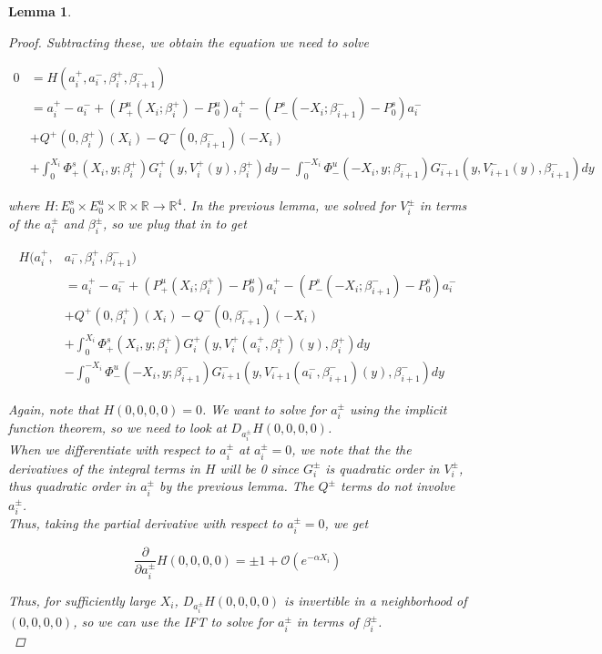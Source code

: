 \documentclass[12pt]{article}
\def\R{{\mathbb R}}
\newtheorem{lemma}{Lemma}
\begin{document}
\begin{lemma}
\begin{proof}
Subtracting these, we obtain the equation we need to solve

\begin{align*}
0 &= H(a_i^+, a_i^-, \beta_i^+, \beta_{i+1}^-) \\
&= a_i^+ - a_i^- + (P^u_+(X_i; \beta_i^+) -  P^u_0)a_i^+ - (P^s_-(-X_i; \beta_{i+1}^-) - P^s_0) a_i^-  \\
&+ Q^+(0, \beta_i^+)(X_i) - Q^-(0, \beta_{i+1}^-)(-X_i)\\
&+ \int_0^{X_i} \Phi_+^s(X_i, y; \beta_i^+) G_i^+(y, V_i^+(y),\beta_i^+)dy
- \int_0^{-X_i} \Phi_-^u(-X_i, y; \beta_{i+1}^-) G_{i+1}^-(y, V_{i+1}^-(y),\beta_{i+1}^-)dy 
\end{align*}

where $H: E_0^s \times E_0^u \times \R \times \R \rightarrow \R^4$. In the previous lemma, we solved for $V_i^\pm$ in terms of the $a_i^\pm$ and $\beta_i^\pm$, so we plug that in to get

\begin{align*}
H(a_i^+, &a_i^-, \beta_i^+, \beta_{i+1}^-) \\
&= a_i^+ - a_i^- + (P^u_+(X_i; \beta_i^+) -  P^u_0)a_i^+ - (P^s_-(-X_i; \beta_{i+1}^-) - P^s_0) a_i^-  \\
&+ Q^+(0, \beta_i^+)(X_i) - Q^-(0, \beta_{i+1}^-)(-X_i)\\
&+ \int_0^{X_i} \Phi_+^s(X_i, y; \beta_i^+) G_i^+(y, V_i^+(a_i^+, \beta_i^+)(y),\beta_i^+)dy \\
&- \int_0^{-X_i} \Phi_-^u(-X_i, y; \beta_{i+1}^-) G_{i+1}^-(y, V_{i+1}^-(a_i^-, \beta_{i+1}^-)(y),\beta_{i+1}^-)dy 
\end{align*}

Again, note that $H(0, 0, 0, 0) = 0$. We want to solve for $a_i^\pm$ using the implicit function theorem, so we need to look at $D_{a_i^\pm} H(0, 0, 0, 0)$.\\

When we differentiate with respect to $a_i^\pm$ at $a_i^\pm = 0$, we note that the the derivatives of the integral terms in $H$ will be 0 since $G_i^\pm$ is quadratic order in $V_i^\pm$, thus quadratic order in $a_i^\pm$ by the previous lemma. The $Q^\pm$ terms do not involve $a_i^\pm$.\\

Thus, taking the partial derivative with respect to $a_i^\pm = 0$, we get

\[
\frac{\partial}{\partial a_i^\pm} H(0, 0, 0, 0) = \pm 1 + \mathcal{O} (e^{-\alpha X_i})
\]

Thus, for sufficiently large $X_i$, $D_{a_i^\pm} H(0, 0, 0, 0)$ is invertible in a neighborhood of $(0, 0, 0, 0)$, so we can use the IFT to solve for $a_i^\pm$ in terms of $\beta_i^\pm$. \\


\end{proof}
\end{lemma}
\end{document}
